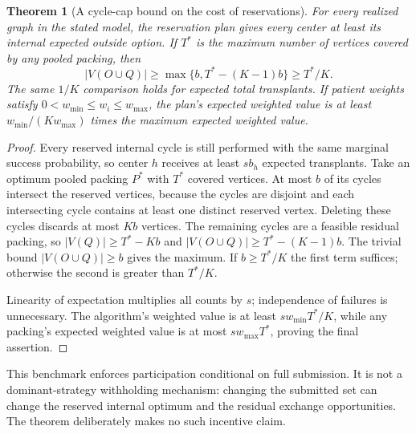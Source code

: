 \documentclass[11pt]{article}
\newtheorem{theorem}{Theorem}
\theoremstyle{remark}
\begin{document}
\begin{theorem}[A cycle-cap bound on the cost of reservations]
For every realized graph in the stated model, the reservation plan gives
every center at least its internal expected outside option. If $T^*$ is
the maximum number of vertices covered by any pooled packing, then
\[
 |V(O\cup Q)|\geq\max\{b,T^*-(K-1)b\}\geq T^*/K.
\]
The same $1/K$ comparison holds for expected total transplants. If
patient weights satisfy $0<w_{\min}\leq w_i\leq w_{\max}$, the plan's
expected weighted value is at least
$w_{\min}/(K w_{\max})$ times the maximum expected weighted value.
\end{theorem}
\begin{proof}
Every reserved internal cycle is still performed with the same marginal
success probability, so center $h$ receives at least $s b_h$ expected
transplants. Take an optimum pooled packing $P^*$ with $T^*$ covered
vertices. At most $b$ of its cycles intersect the reserved vertices,
because the cycles are disjoint and each intersecting cycle contains
at least one distinct reserved vertex. Deleting these cycles discards
at most $K b$ vertices. The remaining cycles are a feasible residual
packing, so $|V(Q)|\geq T^*-K b$ and
$|V(O\cup Q)|\geq T^*-(K-1)b$. The trivial bound $|V(O\cup Q)|\geq b$
gives the maximum. If $b\geq T^*/K$ the first term suffices; otherwise
the second is greater than $T^*/K$.

Linearity of expectation multiplies all counts by $s$; independence
of failures is unnecessary. The algorithm's weighted value is at least
$s w_{\min}T^*/K$, while any packing's expected weighted value is at
most $s w_{\max}T^*$, proving the final assertion.
\end{proof}

This benchmark enforces participation conditional on full submission.
It is not a dominant-strategy withholding mechanism: changing the
submitted set can change the reserved internal optimum and the residual
exchange opportunities. The theorem deliberately makes no such
incentive claim.
\end{document}
